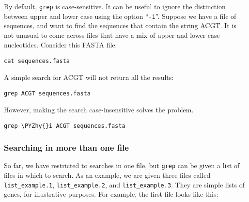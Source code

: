 \documentclass[11pt]{article}
\makeatletter
\def\PYZhy{\char`\-}
\newcommand{\boxspacing}{\kern\kvtcb@left@rule\kern\kvtcb@boxsep}
\newcommand{\prompt}[4]{
       \ttfamily\llap{{\color{#2}\LARGE\faKeyboardO\hspace{3pt}#4}}\vspace{-\baselineskip}
    }
\makeatother
\begin{document}
By default, \texttt{grep} is case-sensitive. It can be useful to ignore
the distinction between upper and lower case using the option
``\texttt{-i}''. Suppose we have a file of sequences, and want to find
the sequences that contain the string ACGT. It is not unusual to come
across files that have a mix of upper and lower case nucleotides.
Consider this FASTA file:

    \begin{tcolorbox}[breakable, size=fbox, boxrule=1pt, pad at break*=1mm,colback=cellbackground, colframe=cellborder]
\prompt{In}{incolor}{ }{\boxspacing}
\begin{Verbatim}[commandchars=\\\{\}]
cat sequences.fasta
\end{Verbatim}
\end{tcolorbox}

    A simple search for ACGT will not return all the results:

    \begin{tcolorbox}[breakable, size=fbox, boxrule=1pt, pad at break*=1mm,colback=cellbackground, colframe=cellborder]
\prompt{In}{incolor}{ }{\boxspacing}
\begin{Verbatim}[commandchars=\\\{\}]
grep ACGT sequences.fasta
\end{Verbatim}
\end{tcolorbox}

    However, making the search case-insensitive solves the problem.

    \begin{tcolorbox}[breakable, size=fbox, boxrule=1pt, pad at break*=1mm,colback=cellbackground, colframe=cellborder]
\prompt{In}{incolor}{ }{\boxspacing}
\begin{Verbatim}[commandchars=\\\{\}]
grep \PYZhy{}i ACGT sequences.fasta
\end{Verbatim}
\end{tcolorbox}

    \hypertarget{searching-in-more-than-one-file}{%
\subsubsection{Searching in more than one
file}\label{searching-in-more-than-one-file}}

So far, we have restricted to searches in one file, but \texttt{grep}
can be given a list of files in which to search. As an example, we are
given three files called \texttt{list\_example.1},
\texttt{list\_example.2}, and \texttt{list\_example.3}. They are simple
lists of genes, for illustrative purposes. For example, the first file
looks like this:
\end{document}
